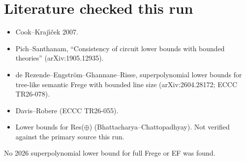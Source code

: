 \documentclass[11pt]{article}
\theoremstyle{definition}\newtheorem{definition}[theorem]{Definition}\newtheorem{remark}[theorem]{Remark}
\begin{document}
\section*{Literature checked this run}
\begin{itemize}
\item Cook--Kraj\'{\i}\v{c}ek 2007.
\item Pich--Santhanam, ``Consistency of circuit lower bounds with bounded theories'' (arXiv:1905.12935).
\item de Rezende--Engstr\"om--Ghannane--Risse, superpolynomial lower bounds for tree-like semantic Frege with bounded line size (arXiv:2604.28172; ECCC TR26-078).
\item Davis--Robere (ECCC TR26-055).
\item Lower bounds for Res($\oplus$) (Bhattacharya--Chattopadhyay). Not verified against the primary source this run.
\end{itemize}
No 2026 superpolynomial lower bound for full Frege or EF was found.
\end{document}
